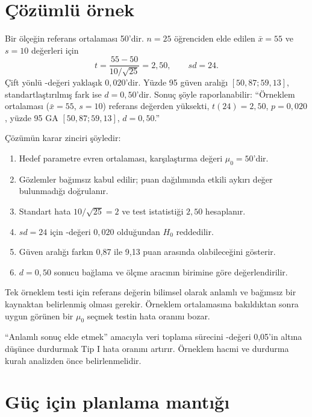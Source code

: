 \section{Çözümlü örnek}

Bir ölçeğin referans ortalaması 50'dir. $n=25$ öğrenciden elde edilen
$\bar x=55$ ve $s=10$ değerleri için
\[
t=\frac{55-50}{10/\sqrt{25}}=2{,}50,
\qquad sd=24.
\]
Çift yönlü \pval-değeri yaklaşık $0{,}020$'dir. Yüzde 95 güven aralığı
$[50{,}87;59{,}13]$, standartlaştırılmış fark ise $d=0{,}50$'dir. Sonuç şöyle
raporlanabilir: ``Örneklem ortalaması ($\bar x=55$, $s=10$) referans
değerden yüksekti, $t(24)=2{,}50$, $p=0{,}020$, yüzde 95 GA
$[50{,}87;59{,}13]$, $d=0{,}50$.''

Çözümün karar zinciri şöyledir:

\begin{enumerate}
  \item Hedef parametre evren ortalaması, karşılaştırma değeri $\mu_0=50$'dir.
  \item Gözlemler bağımsız kabul edilir; puan dağılımında etkili aykırı değer bulunmadığı doğrulanır.
  \item Standart hata $10/\sqrt{25}=2$ ve test istatistiği $2{,}50$ hesaplanır.
  \item $sd=24$ için \pval-değeri $0{,}020$ olduğundan $H_0$ reddedilir.
  \item Güven aralığı farkın 0,87 ile 9,13 puan arasında olabileceğini gösterir.
  \item $d=0{,}50$ sonucu bağlama ve ölçme aracının birimine göre değerlendirilir.
\end{enumerate}

\begin{assumptionbox}
Tek örneklem \tstat testi için referans değerin bilimsel olarak anlamlı ve bağımsız
bir kaynaktan belirlenmiş olması gerekir. Örneklem ortalamasına bakıldıktan
sonra uygun görünen bir $\mu_0$ seçmek testin hata oranını bozar.
\end{assumptionbox}

\begin{mistakebox}
``Anlamlı sonuç elde etmek'' amacıyla veri toplama sürecini \pval-değeri
0,05'in altına düşünce durdurmak Tip I hata oranını artırır. Örneklem hacmi
ve durdurma kuralı analizden önce belirlenmelidir.
\end{mistakebox}

\section{Güç için planlama mantığı}

